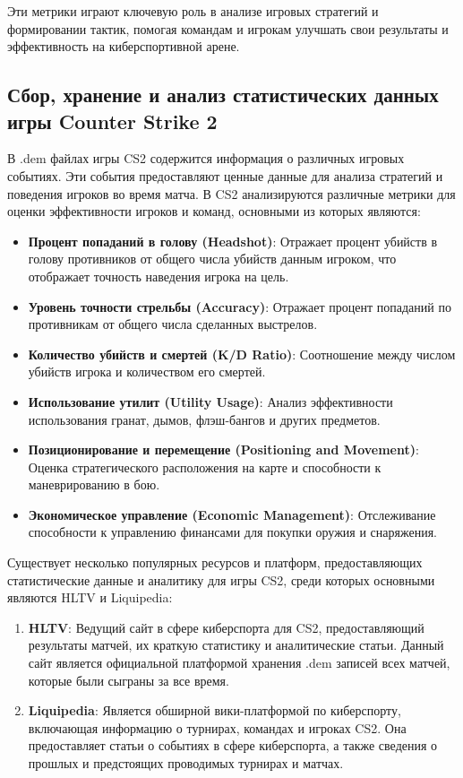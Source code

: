 Эти метрики играют ключевую роль в анализе игровых стратегий и формировании тактик, помогая командам и игрокам улучшать свои результаты и эффективность на киберспортивной арене.
\subsection{Сбор, хранение и анализ статистических данных игры Counter Strike 2}

В .dem файлах игры CS2 содержится информация о различных игровых событиях. Эти события предоставляют ценные данные для анализа стратегий и поведения игроков во время матча. В CS2 анализируются различные метрики для оценки эффективности игроков и команд, основными из которых являются:

\begin{itemize}
	\item \textbf{Процент попаданий в голову (Headshot)}:
	Отражает процент убийств в голову противников от общего числа убийств данным игроком, что отображает точность наведения игрока на цель.
	\item \textbf{Уровень точности стрельбы (Accuracy)}:
	Отражает процент попаданий по противникам от общего числа сделанных выстрелов.
	\item \textbf{Количество убийств и смертей (K/D Ratio)}:
	Соотношение между числом убийств игрока и количеством его смертей.
	\item \textbf{Использование утилит (Utility Usage)}:
	Анализ эффективности использования гранат, дымов, флэш-бангов и других предметов.
	\item \textbf{Позиционирование и перемещение (Positioning and Movement)}:
	Оценка стратегического расположения на карте и способности к маневрированию в бою.
	\item \textbf{Экономическое управление (Economic Management)}:
	Отслеживание способности к управлению финансами для покупки оружия и снаряжения.
\end{itemize}

Существует несколько популярных ресурсов и платформ, предоставляющих статистические данные и аналитику для игры CS2, среди которых основными являются HLTV и Liquipedia:

\begin{enumerate}
	\item \textbf{HLTV}:
	Ведущий сайт в сфере киберспорта для CS2, предоставляющий результаты матчей, их краткую статистику и аналитические статьи. Данный сайт является официальной платформой хранения .dem записей всех матчей, которые были сыграны за все время.
	\item \textbf{Liquipedia}:
	Является обширной вики-платформой по киберспорту, включающая информацию о турнирах, командах и игроках CS2. Она предоставляет статьи о событиях в сфере киберспорта, а также сведения о прошлых и предстоящих проводимых турнирах и матчах.
\end{enumerate}

